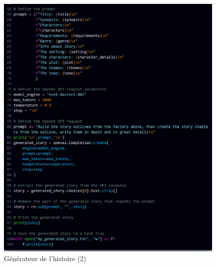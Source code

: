 \documentclass[11,5pt]{report}
\begin{document}
\begin{spacing}{2}
\begin{spacing}{2}
\begin{figure}[htbp]
    \centering
    \includegraphics[keepaspectratio=true,scale=0.2]{images/creationScript2.png}
    \caption{Générateur de l'histoire (2)}
    \label{fig:generator2}
\end{figure}


\end{spacing}
\end{spacing}
\end{document}
